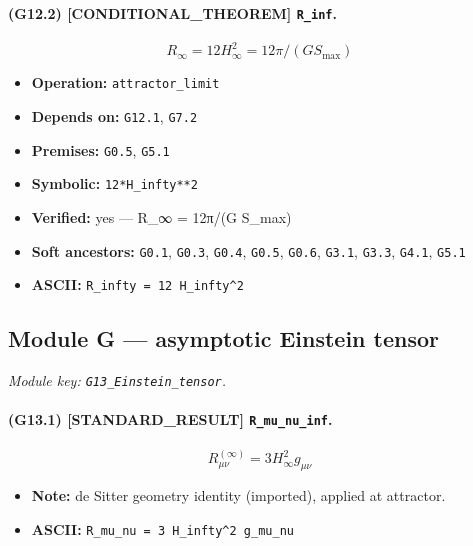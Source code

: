 \documentclass[11pt,a4paper]{article}
\theoremstyle{remark}\newtheorem*{caution}{Caution}
\newcommand{\tagbox}[1]{\textsc{[#1]}}
\begin{document}
\paragraph{(G12.2) \tagbox{CONDITIONAL\_THEOREM} \texttt{R\_inf}.}
\begin{equation}
R_\infty=12 H_\infty^2=12\pi/(G S_{\max})
\tag{G12.2}
\end{equation}
\begin{itemize}\setlength{\itemsep}{0.12em}
\item \textbf{Operation:} \texttt{attractor\_limit}
\item \textbf{Depends on:} \texttt{G12.1}, \texttt{G7.2}
\item \textbf{Premises:} \texttt{G0.5}, \texttt{G5.1}
\item \textbf{Symbolic:} \texttt{12*H\_infty**2}
\item \textbf{Verified:} yes --- R\_∞ = 12π/(G S\_max)
\item \textbf{Soft ancestors:} \texttt{G0.1}, \texttt{G0.3}, \texttt{G0.4}, \texttt{G0.5}, \texttt{G0.6}, \texttt{G3.1}, \texttt{G3.3}, \texttt{G4.1}, \texttt{G5.1}
\item \textbf{ASCII:} \texttt{R\_infty = 12 H\_infty^2}
\end{itemize}
\subsection{Module G --- asymptotic Einstein tensor}
\textit{Module key: \texttt{G13\_Einstein\_tensor}.}
\paragraph{(G13.1) \tagbox{STANDARD\_RESULT} \texttt{R\_mu\_nu\_inf}.}
\begin{equation}
R^{(\infty)}_{\mu\nu}=3 H_\infty^2 g_{\mu\nu}
\tag{G13.1}
\end{equation}
\begin{itemize}\setlength{\itemsep}{0.12em}
\item \textbf{Note:} de Sitter geometry identity (imported), applied at attractor.
\item \textbf{ASCII:} \texttt{R\_mu\_nu = 3 H\_infty^2 g\_mu\_nu}
\end{itemize}
\end{document}
